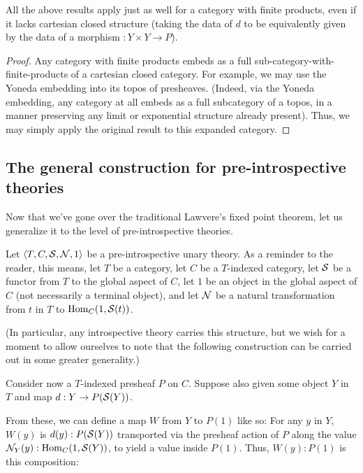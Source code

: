 \begin{corollary}
All the above results apply just as well for a category with finite products, even if it lacks cartesian closed structure (taking the data of $d$ to be equivalently given by the data of a morphism $: Y \times Y \to P$).
\end{corollary}
\begin{proof}
Any category with finite products embeds as a full sub-category-with-finite-products of a cartesian closed category. For example, we may use the Yoneda embedding into its topos of presheaves. (Indeed, via the Yoneda embedding, any category at all embeds as a full subcategory of a topos, in a manner preserving any limit or exponential structure already present). Thus, we may simply apply the original result to this expanded category.
\end{proof}

\subsection{The general construction for pre-introspective theories}
Now that we've gone over the traditional Lawvere's fixed point theorem, let us generalize it to the level of pre-introspective theories.

\label{GeneralDiag}
Let $\langle T, C, \mathcal{S}, \mathcal{N}, 1 \rangle$ be a pre-introspective unary theory. As a reminder to the reader, this means, let $T$ be a category, let $C$ be a $T$-indexed category, let $\mathcal{S}$ be a functor from $T$ to the global aspect of $C$, let $1$ be an object in the global aspect of $C$ (not necessarily a terminal object), and let $\mathcal{N}$ be a natural transformation from $t$ in $T$ to $\operatorname{Hom}_C(1, \mathcal{S}(t))$.

(In particular, any introspective theory carries this structure, but we wish for a moment to allow ourselves to note that the following construction can be carried out in some greater generality.)

Consider now a $T$-indexed presheaf $P$ on $C$. Suppose also given some object $Y$ in $T$ and map $d : Y \to P(\mathcal{S}(Y))$.

From these, we can define a map $W$ from $Y$ to $P(1)$ like so: For any $y$ in $Y$, $W(y)$ is $d(y) : P(\mathcal{S}(Y))$ transported via the presheaf action of $P$ along the value $\mathcal{N}_Y(y) : \operatorname{Hom}_C(1, \mathcal{S}(Y))$, to yield a value inside $P(1)$. Thus, $W(y) : P(1)$ is this composition:

